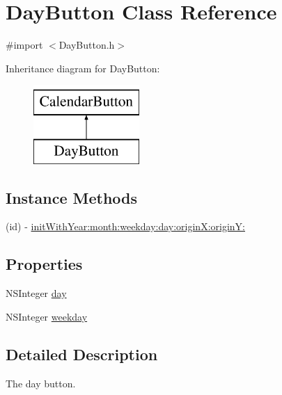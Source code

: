 \hypertarget{interface_day_button}{\section{Day\+Button Class Reference}
\label{interface_day_button}
}


{\ttfamily \#import $<$Day\+Button.\+h$>$}

Inheritance diagram for Day\+Button\+:\begin{figure}[H]
\begin{center}
\leavevmode
\includegraphics[height=3.000000cm]{interface_day_button}
\end{center}
\end{figure}
\subsection*{Instance Methods}
\begin{DoxyCompactItemize}
\item 
(id) -\/ \hyperlink{interface_day_button_aaa3527d1ba28e02fbccf327df41bff5f}{init\+With\+Year\+:month\+:weekday\+:day\+:origin\+X\+:origin\+Y\+:}
\end{DoxyCompactItemize}
\subsection*{Properties}
\begin{DoxyCompactItemize}
\item 
N\+S\+Integer \hyperlink{interface_day_button_a1a1e6a38a27c7ffafcd2b47c9e677ce3}{day}
\item 
N\+S\+Integer \hyperlink{interface_day_button_a992bfe27780dcf5616639d4259a7b1b6}{weekday}
\end{DoxyCompactItemize}


\subsection{Detailed Description}
The day button. 

